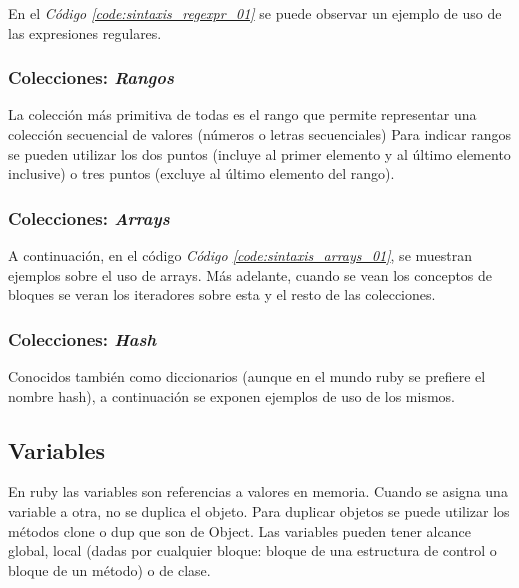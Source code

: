 \documentclass{article}
\newcommand{\refcode}[1]{\textit{Código \ref{#1}}}
\begin{document}
\noindent En el \refcode{code:sintaxis_regexpr_01} se puede observar un ejemplo de uso de las expresiones regulares.

 
\bigskip


\subsubsection{Colecciones: \textit{Rangos}}
La colección más primitiva de todas es el rango que permite representar una colección secuencial de valores (números o letras secuenciales)
Para indicar rangos se pueden utilizar los dos puntos (incluye al primer elemento y al último elemento inclusive) o tres puntos (excluye al último elemento del rango).

 
\bigskip


\subsubsection{Colecciones: \textit{Arrays}}
A continuación, en el código \refcode{code:sintaxis_arrays_01}, se muestran ejemplos sobre el uso de arrays. Más adelante, cuando se vean los conceptos de bloques se veran los iteradores sobre esta y el resto de las colecciones.

 
\bigskip

\subsubsection{Colecciones: \textit{Hash}}
Conocidos también como diccionarios (aunque en el mundo ruby se prefiere el nombre hash), a continuación se exponen ejemplos de uso de los mismos.

 
\bigskip


\subsection{Variables}
En ruby las variables son referencias a valores en memoria. Cuando se asigna una variable a otra, no se duplica el objeto. Para duplicar objetos se puede utilizar los métodos clone o dup que son de Object.
Las variables pueden tener alcance global, local (dadas por cualquier bloque: bloque de una estructura de control o bloque de un método) o de clase.
\end{document}
